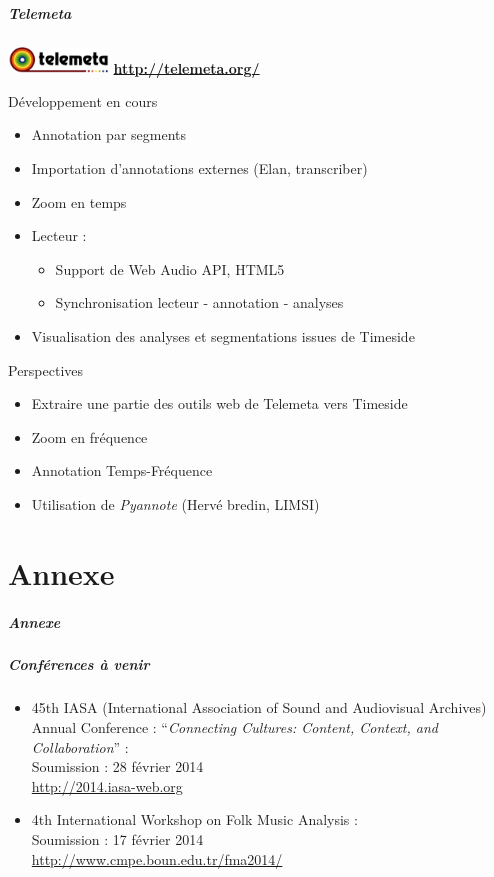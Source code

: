 \documentclass[10pt, final, hyperref, table]{beamer}
\begin{document}
\begin{frame}
\frametitle{Telemeta}
    \begin{flushleft}
    \includegraphics[width=0.2\textwidth]{img/logo_telemeta_1-1.pdf} \hfill
    \colorbox{yellow!50}{\textbf{\url{http://telemeta.org/}}}
  \end{flushleft}
  \begin{block}{Développement en cours}
    \begin{itemize}
    \item Annotation par segments
    \item Importation d'annotations externes (Elan, transcriber)
    \item Zoom en temps
    \item Lecteur :
      \begin{itemize}
      \item Support de Web Audio API, HTML5
      \item Synchronisation lecteur - annotation - analyses
      \end{itemize}
    \item Visualisation des analyses et segmentations issues de Timeside 
    \end{itemize}
  \end{block}
  \begin{block}{Perspectives}
    \begin{itemize}
    \item Extraire une partie des outils web de Telemeta vers Timeside
    \item Zoom en fréquence
    \item Annotation Temps-Fréquence
    \item Utilisation de \emph{Pyannote} (Hervé bredin, LIMSI)
    \end{itemize}
  \end{block}
\end{frame}
\part{Annexe}
\begin{frame}
  \frametitle{Annexe}

\end{frame}
\begin{frame}
\frametitle{Conférences à venir}
\begin{itemize}
\item 45th IASA (International Association of Sound and Audiovisual Archives) Annual Conference : ``\emph{Connecting Cultures: Content, Context, and Collaboration}'' :\\ 
\alert{Soumission : 28 février 2014} \\
\url{http://2014.iasa-web.org}
\item 4th International Workshop on Folk Music Analysis :\\ 
\alert{Soumission : 17 février 2014} \\
\url{http://www.cmpe.boun.edu.tr/fma2014/}
\end{itemize}
\end{frame}
\end{document}
